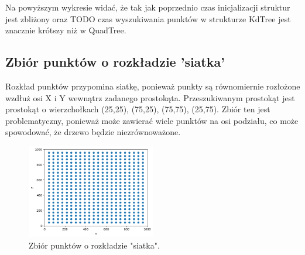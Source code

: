 \documentclass{lab}
\begin{document}
Na powyższym wykresie widać, że tak jak poprzednio czas inicjalizacji struktur jest zbliżony oraz TODO czas wyszukiwania punktów w strukturze KdTree jest znacznie krótszy niż w QuadTree.

\newpage
\subsection{Zbiór punktów o rozkładzie 'siatka'}
Rozkład punktów przypomina siatkę, ponieważ punkty są równomiernie rozłożone wzdłuż osi X i Y wewnątrz zadanego prostokąta.
Przeszukiwanym prostokąt jest prostokąt o wierzchołkach (25,25), (75,25), (75,75), (25,75).
Zbiór ten jest problematyczny, ponieważ może zawierać wiele punktów na osi podziału, co może spowodować, że drzewo będzie niezrównoważone.

\begin{figure}[H]
  \centering
  \includegraphics[width=0.5\textwidth]{resources/grid.png}
  \caption{Zbiór punktów o rozkładzie "siatka".}
  \label{fig:grid}
\end{figure}
\end{document}
